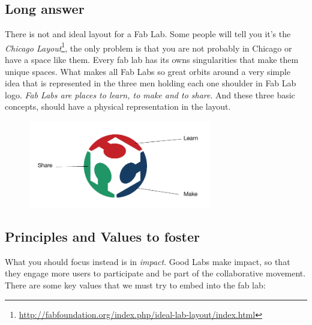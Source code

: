 \documentclass[a4paper,12pt,titlepage]{article}
\begin{document}
\subsection{Long answer}
There is not and ideal layout for a Fab Lab. Some people will tell you it's the \textit{Chicago Layout}\footnote{\url{http://fabfoundation.org/index.php/ideal-lab-layout/index.html}}, the only problem is that you are not probably in Chicago or have a space like them. Every fab lab has its owns singularities that make
them unique spaces. What makes all Fab Labs so great orbits around a very simple idea that
is represented in the three men holding each one shoulder in Fab Lab logo. \textit{Fab Labs are
places to learn, to make and to share}. And these three basic concepts, should have a physical representation in the layout. 

\begin{figure}[ht] %
   \centering
   \includegraphics[width=8cm]{files/learn-make-share} 
\end{figure}


\subsection{Principles and Values to foster}
What you should focus instead is in \textit{impact}. Good Labs make impact, so that they engage more users to participate and be part of the collaborative movement. There are some key values that we must try to embed into the fab lab:
\end{document}
